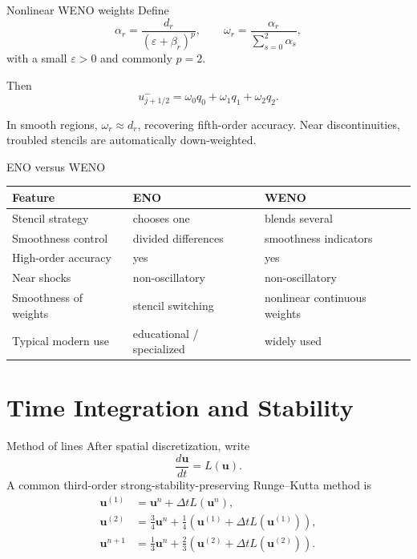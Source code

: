 \documentclass[aspectratio=169]{beamer}
\newcommand{\dt}{\Delta t}
\begin{document}
\begin{frame}{Nonlinear WENO weights}
Define
\begin{equation}
    \alpha_r=\frac{d_r}{(\varepsilon+\beta_r)^p},
    \qquad
    \omega_r=\frac{\alpha_r}{\sum_{s=0}^{2}\alpha_s},
\end{equation}
with a small $\varepsilon>0$ and commonly $p=2$.

\medskip
Then
\begin{equation}
    u^-_{j+1/2}
    =\omega_0q_0+\omega_1q_1+\omega_2q_2.
\end{equation}

In smooth regions, $\omega_r\approx d_r$, recovering fifth-order accuracy. Near discontinuities, troubled stencils are automatically down-weighted.
\end{frame}

\begin{frame}{ENO versus WENO}
\begin{table}
\centering
\begin{tabular}{lll}
\toprule
Feature & ENO & WENO \\
\midrule
Stencil strategy & chooses one & blends several \\
Smoothness control & divided differences & smoothness indicators \\
High-order accuracy & yes & yes \\
Near shocks & non-oscillatory & non-oscillatory \\
Smoothness of weights & stencil switching & nonlinear continuous weights \\
Typical modern use & educational / specialized & widely used \\
\bottomrule
\end{tabular}
\end{table}
\end{frame}

\section{Time Integration and Stability}

\begin{frame}{Method of lines}
After spatial discretization, write
\begin{equation}
    \frac{d\bm{u}}{dt}=L(\bm{u}).
\end{equation}
A common third-order strong-stability-preserving Runge--Kutta method is
\begin{align*}
\bm{u}^{(1)} &= \bm{u}^{n}+\dt L(\bm{u}^{n}),\\
\bm{u}^{(2)} &= \frac34\bm{u}^{n}
+\frac14\left(\bm{u}^{(1)}+\dt L(\bm{u}^{(1)})\right),\\
\bm{u}^{n+1} &= \frac13\bm{u}^{n}
+\frac23\left(\bm{u}^{(2)}+\dt L(\bm{u}^{(2)})\right).
\end{align*}
\end{frame}
\end{document}
